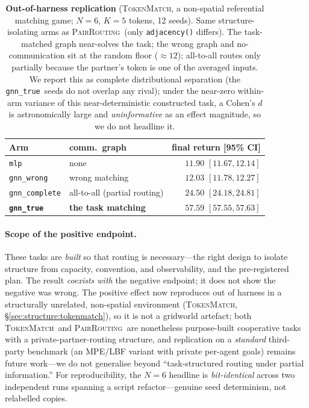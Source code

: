 \documentclass[manuscript, screen, review]{jair}
\newcommand{\gtrue}{\texttt{gnn\_true}}
\newcommand{\gwrong}{\texttt{gnn\_wrong}}
\newcommand{\gcomplete}{\texttt{gnn\_complete}}
\newcommand{\mlpc}{\texttt{mlp}}
\newcommand{\pairrouting}{\textsc{PairRouting}}
\newcommand{\tokenmatch}{\textsc{TokenMatch}}
\newcommand{\TMfloor}{12}             %
\newcommand{\TMmlp}{11.90}            %
\newcommand{\TMmlpLo}{11.67}
\newcommand{\TMmlpHi}{12.14}
\newcommand{\TMwrong}{12.03}          %
\newcommand{\TMwrongLo}{11.78}
\newcommand{\TMwrongHi}{12.27}
\newcommand{\TMcomplete}{24.50}       %
\newcommand{\TMcompleteLo}{24.18}
\newcommand{\TMcompleteHi}{24.81}
\newcommand{\TMtrue}{57.59}           %
\newcommand{\TMtrueLo}{57.55}
\newcommand{\TMtrueHi}{57.63}
\begin{document}
\begin{table}[t]
  \centering
  \small
  \caption{\textbf{Out-of-harness replication} (\tokenmatch, a non-spatial
  referential matching game; $N{=}6$, $K{=}5$ tokens, 12 seeds). Same
  structure-isolating arms as \pairrouting\ (only \texttt{adjacency()}
  differs). The task-matched graph near-solves the task; the wrong graph and
  no-communication sit at the random floor (${\approx}\TMfloor$); all-to-all
  routes only partially because the partner's token is one of the averaged
  inputs. We report this as complete distributional separation (the \gtrue\
  seeds do not overlap any rival); under the near-zero within-arm variance of
  this near-deterministic constructed task, a Cohen's $d$ is astronomically
  large and \emph{uninformative} as an effect magnitude, so we do not headline
  it.}
  \label{tab:tokenmatch}
  \begin{tabular}{llr}
    \toprule
    Arm & comm.\ graph & final return [95\% CI] \\
    \midrule
    \mlpc      & none                  & $\TMmlp$ $[\TMmlpLo, \TMmlpHi]$ \\
    \gwrong    & wrong matching        & $\TMwrong$ $[\TMwrongLo, \TMwrongHi]$ \\
    \gcomplete & all-to-all (partial routing) & $\TMcomplete$ $[\TMcompleteLo, \TMcompleteHi]$ \\
    \textbf{\gtrue} & \textbf{the task matching} & $\mathbf{\TMtrue}$ $[\TMtrueLo, \TMtrueHi]$ \\
    \bottomrule
  \end{tabular}
\end{table}

\paragraph{Scope of the positive endpoint.} These tasks are \emph{built} so
that routing is necessary---the right design to isolate structure from
capacity, convention, and observability, and the pre-registered plan. The
result \emph{coexists with} the negative endpoint; it does not show the
negative was wrong. The positive effect now reproduces out of harness in a
structurally unrelated, non-spatial environment (\tokenmatch,
\S\ref{sec:structure:tokenmatch}), so it is not a gridworld artefact; both
\tokenmatch\ and \pairrouting\ are nonetheless purpose-built cooperative tasks
with a private-partner-routing structure, and replication on a \emph{standard}
third-party benchmark (an MPE/LBF variant with private per-agent goals)
remains future work---we do not generalise beyond ``task-structured routing
under partial information.'' For reproducibility, the $N{=}6$ headline is
\emph{bit-identical} across two independent runs spanning a script
refactor---genuine seed determinism, not relabelled copies.
\end{document}
